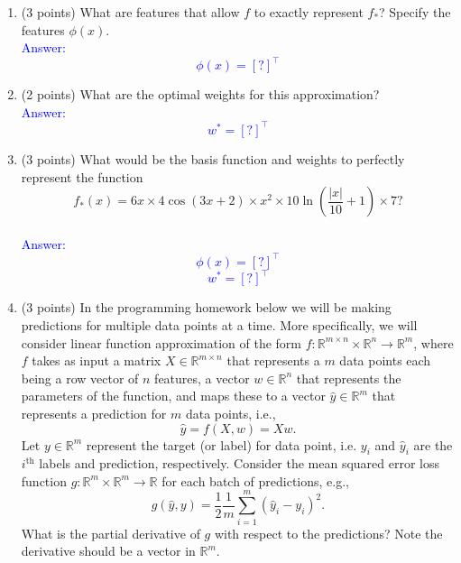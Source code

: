 \documentclass{article}
\begin{document}
\begin{enumerate}
    \item (3 points) What are features that allow $f$ to exactly represent $f_*$? Specify the features $\phi(x)$. \\
    \textcolor{blue}{Answer: 
    \begin{equation}
        \phi(x) = \left [? \right ]^\top
    \end{equation}
    }
    \item (2 points) What are the optimal weights for this approximation? \\
    \textcolor{blue}{Answer: 
    \begin{equation}
        w^* = \left [? \right ]^\top
    \end{equation}
    }
    \item (3 points) What would be the basis function and weights to perfectly represent the function 
    \begin{equation}
        f_*(x) = 6x \times4 \cos(3x + 2) \times x^2 \times 10 \ln \left( \frac{|x|}{10} +1\right)\times 7?
    \end{equation} \\
    \textcolor{blue}{Answer:
    \begin{equation}
        \phi(x) = \left [?  \right ]^\top
    \end{equation}
    \begin{equation}
        w^* = \left [? \right ]^\top
    \end{equation}
    }
    \item (3 points) In the programming homework below we will be making predictions for multiple data points at a time. More specifically, we will consider linear function approximation of the form $f \colon \mathbb{R}^{m \times n} \times \mathbb{R}^n \to \mathbb{R}^m$, where $f$ takes as input a matrix $X \in \mathbb{R}^{m \times n}$ that represents a $m$ data points each being a row vector of $n$ features, a vector $w \in \mathbb{R}^n$ that represents the parameters of the function, and maps these to a vector $\hat y \in \mathbb{R}^m$ that represents a prediction for $m$ data points, i.e., 
    \begin{equation}
        \hat y = f(X,w) = Xw.
    \end{equation}
    Let $y \in \mathbb{R}^m$ represent the target (or label) for data point, i.e. $y_i$ and $\hat y_i$ are the $i^\text{th}$ labels and prediction, respectively. Consider the mean squared error loss function $g \colon \mathbb{R}^m \times \mathbb{R}^m \to \mathbb{R}$ for each batch of predictions, e.g., 
    \begin{equation}
        g(\hat y, y) = \frac{1}{2}\frac{1}{m} \sum_{i = 1}^m \left (\hat y_i - y_i \right )^2.
    \end{equation}
    What is the partial derivative of $g$ with respect to the predictions? Note the derivative should be a vector in $\mathbb{R}^m$.
    

\end{enumerate}
\end{document}
